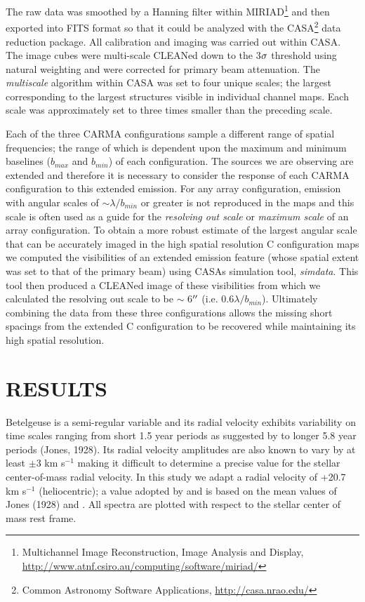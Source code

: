 \documentclass[iop]{emulateapj}
\begin{document}
The raw data was smoothed by a Hanning filter within MIRIAD\footnote{Multichannel Image Reconstruction, Image Analysis and Display, \url{http://www.atnf.csiro.au/computing/software/miriad/}} and then exported into FITS format so that it could be analyzed with the CASA\footnote{Common Astronomy Software Applications, \url{http://casa.nrao.edu/}} data reduction package. All calibration and imaging was carried out within CASA. The image cubes  were multi-scale  CLEANed down to the 3$\rm{\sigma}$ threshold using natural weighting and were corrected for primary beam attenuation. The \textit{multiscale} algorithm \citep{2008AJ....136.2897R} within CASA was set to four unique scales; the largest corresponding to the largest structures visible in individual channel maps. Each scale was approximately set to three times smaller than the preceding scale. 

Each of the three CARMA configurations sample a different range of spatial frequencies; the range of which is dependent upon the maximum and minimum baselines ($b_{max}$ and $b_{min}$) of each configuration. The sources we are observing are extended and therefore it is necessary to consider the response of each CARMA configuration to this extended emission. For any array configuration, emission with angular scales of $\sim \lambda/b_{min}$ or greater is not reproduced in the maps \citep{1999ASPC..180.....T} and this scale is often used as a guide for the \textit{resolving out scale} or \textit{maximum scale} of an array configuration. To obtain a more robust estimate of the largest angular scale that can be accurately imaged in the high spatial resolution C configuration maps we computed the visibilities of an extended emission feature (whose spatial extent was set to that of the primary beam) using CASAs simulation tool, \textit{simdata}. This tool then produced a CLEANed image of these visibilities from which we calculated the resolving out scale to be $\sim$ 6$\mbox{$^{\prime\prime}$}$ 
(i.e. $0.6\lambda/b_{min}$). Ultimately combining the data from these three configurations allows the missing short spacings from the extended C configuration to be recovered while maintaining its high spatial resolution.

\section{RESULTS} 

Betelgeuse is a  semi-regular variable and its radial velocity exhibits variability on time scales ranging from short 1.5 year periods as suggested by \cite{1931PWasO..15..178S} to longer 5.8 year periods (Jones, 1928). Its radial velocity amplitudes are also known to vary by at least $\pm$3 km s${}^{-1}$ \citep{1989AJ.....98.2233S} making it difficult to determine a precise value for the stellar center-of-mass radial velocity. In this study we adapt a radial velocity of +20.7 km s${}^{-1}$ (heliocentric); a value adopted by \citet{2008AJ....135.1430H} and is based on the mean values of Jones (1928) and \cite{1933CMWCI.464....1S}. All spectra are plotted with respect to the stellar center of mass rest frame.
\end{document}
